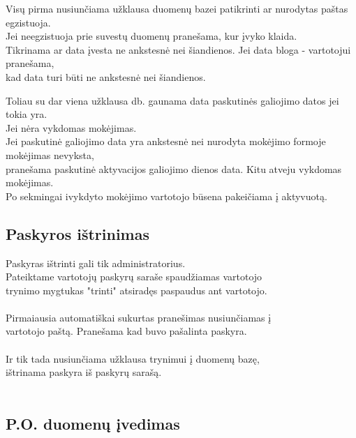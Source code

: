\documentclass[a4paper,12pt]{article}
\begin{document}
Visų pirma nusiunčiama užklausa duomenų bazei patikrinti ar nurodytas paštas egzistuoja. \\
Jei neegzistuoja prie suvestų duomenų pranešama, kur įvyko klaida.\\

Tikrinama ar data įvesta ne ankstesnė nei šiandienos. Jei data bloga - vartotojui pranešama, \\
kad data turi būti ne ankstesnė nei šiandienos.

Toliau su dar viena užklausa db. gaunama data paskutinės galiojimo datos jei tokia yra. \\
Jei nėra vykdomas mokėjimas. \\
Jei paskutinė galiojimo data yra ankstesnė nei nurodyta mokėjimo formoje mokėjimas nevyksta, \\
pranešama paskutinė aktyvacijos galiojimo dienos data. Kitu atveju vykdomas mokėjimas. \\

Po sekmingai ivykdyto mokėjimo vartotojo būsena pakeičiama į aktyvuotą.
  


\subsection{ Paskyros ištrinimas }

Paskyras ištrinti gali tik administratorius.\\

Pateiktame vartotojų paskyrų saraše spaudžiamas vartotojo \\
trynimo mygtukas "trinti" atsiradęs paspaudus ant vartotojo.\\\\

Pirmaiausia automatiškai sukurtas pranešimas nusiunčiamas į \\
vartotojo paštą. Pranešama kad buvo pašalinta paskyra. \\\\

Ir tik tada nusiunčiama užklausa trynimui į duomenų bazę, \\
ištrinama paskyra iš paskyrų sarašą. \\\\
	
	
\subsection{ P.O. duomenų įvedimas }
\end{document}
